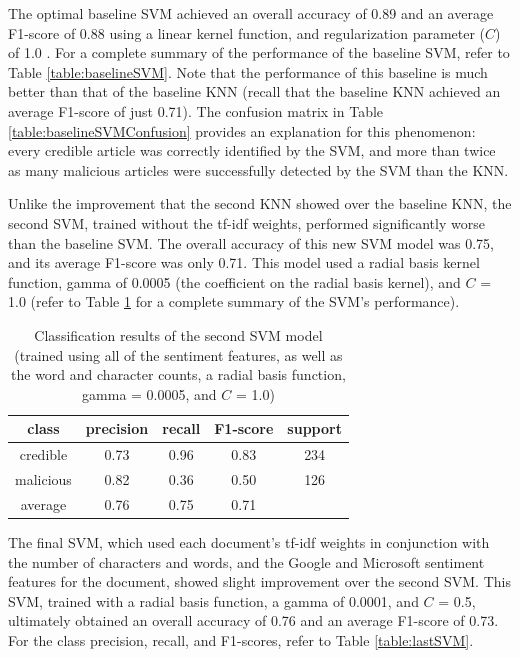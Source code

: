 The optimal baseline SVM achieved an overall accuracy of 0.89 and an average F1-score of 0.88 using a linear kernel function, and regularization parameter ($C$) of 1.0 \cite{svcDoc}.  For a complete summary of the performance of the baseline SVM, refer to Table \ref{table:baselineSVM}.  Note that the performance of this baseline is much better than that of the baseline KNN (recall that the baseline KNN achieved an average F1-score of just 0.71).  The confusion matrix in Table \ref{table:baselineSVMConfusion} provides an explanation for this phenomenon: every credible article was correctly identified by the SVM, and more than twice as many malicious articles were successfully detected by the SVM than the KNN.

Unlike the improvement that the second KNN showed over the baseline KNN, the second SVM, trained without the tf-idf weights, performed significantly worse than the baseline SVM.  The overall accuracy of this new SVM model was 0.75, and its average F1-score was only 0.71.  This model used a radial basis kernel function, gamma of 0.0005 (the coefficient on the radial basis kernel), and $C$ = 1.0 (refer to Table \ref{table:secondSVM} for a complete summary of the SVM's performance).


\begin{table}[h!]
\centering
\begin{tabular}{|c | c  c  c | c|}
\hline
class      & precision & recall & F1-score & support\\
\hline
credible   & 0.73      & 0.96   & 0.83     & 234    \\
malicious  & 0.82      & 0.36   & 0.50     & 126    \\
\hline
average    & 0.76      & 0.75   & 0.71     &   \\
\hline
\end{tabular}
\caption[Second SVM's Classification Report]{Classification results of the second SVM model (trained using all of the sentiment features, as well as the word and character counts, a radial basis function, gamma = 0.0005, and $C$ = 1.0)}
\label{table:secondSVM}
\end{table}


The final SVM, which used each document's tf-idf weights in conjunction with the number of characters and words, and the Google and Microsoft sentiment features for the document, showed slight improvement over the second SVM.  This SVM, trained with a radial basis function, a gamma of 0.0001, and $C$ = 0.5, ultimately obtained an overall accuracy of 0.76 and an average F1-score of 0.73.  For the class precision, recall, and F1-scores, refer to Table \ref{table:lastSVM}.


